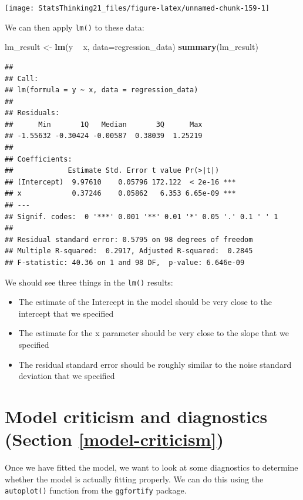 \documentclass[12pt,]{book}
\newenvironment{Shaded}{\begin{snugshade}}{\end{snugshade}}
\newcommand{\DataTypeTok}[1]{\textcolor[rgb]{0.13,0.29,0.53}{#1}}
\newcommand{\KeywordTok}[1]{\textcolor[rgb]{0.13,0.29,0.53}{\textbf{#1}}}
\newcommand{\NormalTok}[1]{#1}
\newcommand{\OperatorTok}[1]{\textcolor[rgb]{0.81,0.36,0.00}{\textbf{#1}}}
\newcommand{\StringTok}[1]{\textcolor[rgb]{0.31,0.60,0.02}{#1}}
\providecommand{\tightlist}{%
  \setlength{\itemsep}{0pt}\setlength{\parskip}{0pt}}
\begin{document}
\texttt{[image: StatsThinking21\_files/figure-latex/unnamed-chunk-159-1]}

We can then apply \texttt{lm()} to these data:

\begin{Shaded}
\begin{Highlighting}[]
\NormalTok{lm_result <-}\StringTok{ }\KeywordTok{lm}\NormalTok{(y }\OperatorTok{~}\StringTok{ }\NormalTok{x, }\DataTypeTok{data=}\NormalTok{regression_data)}
\KeywordTok{summary}\NormalTok{(lm_result)}
\end{Highlighting}
\end{Shaded}

\begin{verbatim}
## 
## Call:
## lm(formula = y ~ x, data = regression_data)
## 
## Residuals:
##      Min       1Q   Median       3Q      Max 
## -1.55632 -0.30424 -0.00587  0.38039  1.25219 
## 
## Coefficients:
##             Estimate Std. Error t value Pr(>|t|)    
## (Intercept)  9.97610    0.05796 172.122  < 2e-16 ***
## x            0.37246    0.05862   6.353 6.65e-09 ***
## ---
## Signif. codes:  0 '***' 0.001 '**' 0.01 '*' 0.05 '.' 0.1 ' ' 1
## 
## Residual standard error: 0.5795 on 98 degrees of freedom
## Multiple R-squared:  0.2917, Adjusted R-squared:  0.2845 
## F-statistic: 40.36 on 1 and 98 DF,  p-value: 6.646e-09
\end{verbatim}

We should see three things in the \texttt{lm()} results:

\begin{itemize}
\tightlist
\item
  The estimate of the Intercept in the model should be very close to the intercept that we specified
\item
  The estimate for the x parameter should be very close to the slope that we specified
\item
  The residual standard error should be roughly similar to the noise standard deviation that we specified
\end{itemize}

\hypertarget{model-criticism-and-diagnostics-section-refmodel-criticism}{%
\section{Model criticism and diagnostics (Section \ref{model-criticism})}\label{model-criticism-and-diagnostics-section-refmodel-criticism}}

Once we have fitted the model, we want to look at some diagnostics to determine whether the model is actually fitting properly. We can do this using the \texttt{autoplot()} function from the \texttt{ggfortify} package.
\end{document}
